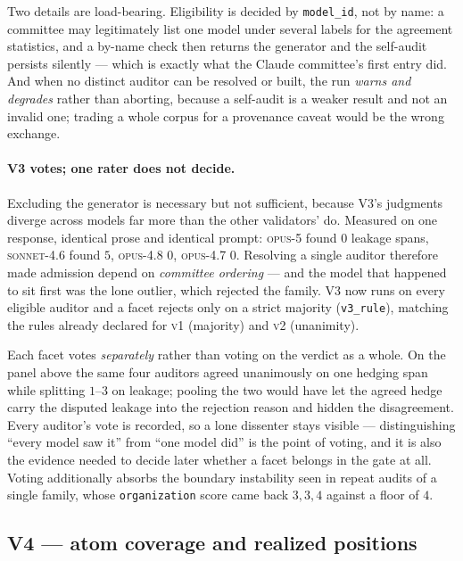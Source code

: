 \documentclass[11pt]{article}
\begin{document}
Two details are load-bearing. Eligibility is decided by \texttt{model\_id}, not by name: a
committee may legitimately list one model under several labels for the agreement statistics, and a
by-name check then returns the generator and the self-audit persists silently --- which is exactly
what the Claude committee's first entry did. And when no distinct auditor can be resolved or built,
the run \emph{warns and degrades} rather than aborting, because a self-audit is a weaker result and
not an invalid one; trading a whole corpus for a provenance caveat would be the wrong exchange.

\paragraph{V3 votes; one rater does not decide.} Excluding the generator is necessary but not
sufficient, because V3's judgments diverge across models far more than the other validators' do.
Measured on one response, identical prose and identical prompt: \textsc{opus-5} found $0$ leakage
spans, \textsc{sonnet-4.6} found $5$, \textsc{opus-4.8} $0$, \textsc{opus-4.7} $0$. Resolving a
single auditor therefore made admission depend on \emph{committee ordering} --- and the model that
happened to sit first was the lone outlier, which rejected the family. V3 now runs on every eligible
auditor and a facet rejects only on a strict majority (\texttt{v3\_rule}), matching the rules already
declared for \textsc{v1} (majority) and \textsc{v2} (unanimity).

Each facet votes \emph{separately} rather than voting on the verdict as a whole. On the panel above
the same four auditors agreed unanimously on one hedging span while splitting $1$--$3$ on leakage;
pooling the two would have let the agreed hedge carry the disputed leakage into the rejection reason
and hidden the disagreement. Every auditor's vote is recorded, so a lone dissenter stays visible ---
distinguishing ``every model saw it'' from ``one model did'' is the point of voting, and it is also
the evidence needed to decide later whether a facet belongs in the gate at all. Voting additionally
absorbs the boundary instability seen in repeat audits of a single family, whose \texttt{organization}
score came back $3,3,4$ against a floor of $4$.

\subsection{V4 --- atom coverage and realized positions}
\end{document}
